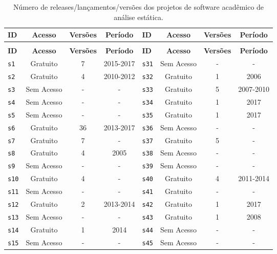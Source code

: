 \begin{longtable}{ l c c c | l c c c }
\caption{Número de releases/lançamentos/versões dos projetos de software acadêmico de análise estática.}
\label{releases-table} \\
  \hline
  \hhline{ l c c c | l c c c |}
  \endfirsthead
  \hhline{ l c c c | l c c c |}
  \hline
  \textbf{ID} & \textbf{Acesso} & \textbf{Versões} & \textbf{Período} & \textbf{ID} & \textbf{Acesso} & \textbf{Versões} & \textbf{Período} \\
  \hline
  \hhline{ l c c c | l c c c |}
  \endhead
  \hhline{----|----}
  \multicolumn{8}{c}{continua na próxima página} \\
  \hhline{----|----} \endfoot
  \hhline{----|----} \endlastfoot
  \textbf{ID} & \textbf{Acesso} & \textbf{Versões} & \textbf{Período} & \textbf{ID} & \textbf{Acesso} & \textbf{Versões} & \textbf{Período} \\
  \hline
\texttt{s1} & Gratuito & 7 & 2015-2017 & \texttt{s31} & Sem Acesso & - & - \\
\texttt{s2} & Gratuito & 4 & 2010-2012 & \texttt{s32} & Gratuito & 1 & 2006 \\
\texttt{s3} & Sem Acesso & - & - & \texttt{s33} & Gratuito & 5 & 2007-2010 \\
\texttt{s4} & Sem Acesso & - & - & \texttt{s34} & Gratuito & 1 & 2017 \\
\texttt{s5} & Sem Acesso & - & - & \texttt{s35} & Gratuito & 1 & 2017 \\
\texttt{s6} & Gratuito & 36 & 2013-2017 & \texttt{s36} & Sem Acesso & - & - \\
\texttt{s7} & Gratuito & 7 & - & \texttt{s37} & Gratuito & 5 & - \\
\texttt{s8} & Gratuito & 4 & 2005 & \texttt{s38} & Sem Acesso & - & - \\
\texttt{s9} & Sem Acesso & - & - & \texttt{s39} & Sem Acesso & - & - \\
\texttt{s10} & Gratuito & 4 & - & \texttt{s40} & Gratuito & 4 & 2011-2014 \\
\texttt{s11} & Sem Acesso & - & - & \texttt{s41} & Gratuito & - & - \\
\texttt{s12} & Gratuito & 2 & 2013-2014 & \texttt{s42} & Gratuito & 1 & 2017 \\
\texttt{s13} & Sem Acesso & - & - & \texttt{s43} & Gratuito & 1 & 2008 \\
\texttt{s14} & Gratuito & 1 & 2014 & \texttt{s44} & Sem Acesso & - & - \\
\texttt{s15} & Sem Acesso & - & - & \texttt{s45} & Sem Acesso & - & - \\

\end{longtable}

